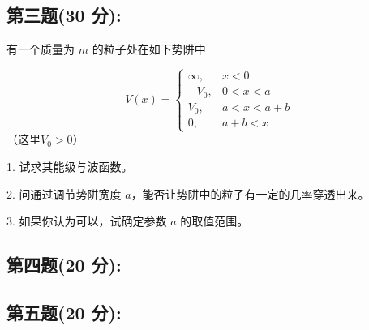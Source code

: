 \subsection{第三题(30 分):}
有一个质量为 \(m\) 的粒子处在如下势阱中

\[
V(x) = 
\begin{cases} 
\infty, & x < 0 \\
-V_0, & 0 < x < a \\
V_0, & a < x < a + b \\
0, & a + b < x
\end{cases}
~\]
（这里$V_0 > 0$）

1. 试求其能级与波函数。

2. 问通过调节势阱宽度 \(a\)，能否让势阱中的粒子有一定的几率穿透出来。

3. 如果你认为可以，试确定参数 \(a\) 的取值范围。
\subsection{第四题(20 分):}

\subsection{第五题(20 分):}